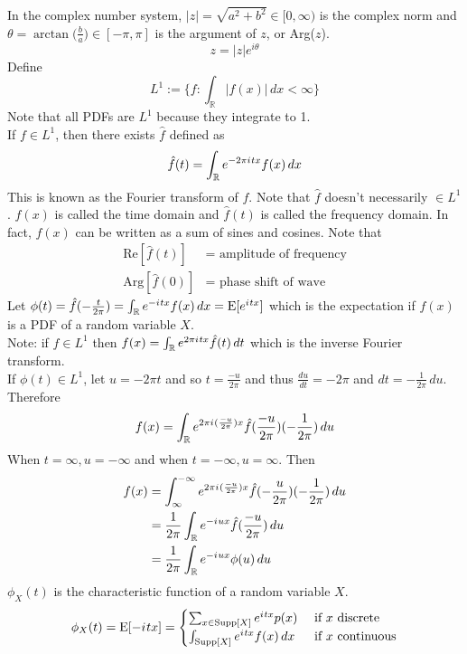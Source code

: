 \documentclass[12pt]{article}
\newcommand{\supp}[1]{\text{Supp}[ #1 ]}
\newcommand{\set}[1]{\Big\{ #1 \Big\}}
\newcommand{\expected}[1]{\mathrm{E}[#1]}
\renewcommand{\i}{{i\mkern1mu}}
\newcommand{\fhat}{\hat{f}}
\begin{document}
In the complex number system, $|z| = \sqrt{a^2 + b^2} \in [0, \infty)$ is the complex norm and $\theta = \arctan \Big( \frac{b}{a}\Big) \in [-\pi, \pi]$ is the argument of $z$, or Arg($z$). $$z = |z| e^{i\theta} $$ 
Define $$L^1 := \set{f: \int_{\mathbb{R}} |f(x)| \, dx < \infty}$$ Note that all PDFs are $L^1$ because they integrate to 1. \\ If $f \in L^1$, then there exists $\fhat$ defined as $$\fhat(t) = \int_{\mathbb{R}} e^{-2\pi \i tx} f(x) \, dx $$ This is known as the Fourier transform of $f$. Note that $\fhat$ doesn't necessarily $\in L^1$. $f(x)$ is called the time domain and $\fhat(t)$ is called the frequency domain. In fact, $f(x)$ can be written as a sum of sines and cosines. Note that 
$$ \begin{aligned} \text{Re}[\fhat(t)] &= \text{ amplitude of frequency} \\ \text{Arg}[\fhat(0)] &= \text{ phase shift of wave} \end{aligned} $$ 
Let $\phi(t) = \fhat(-\frac{t}{2\pi}) = \int_{\mathbb{R}} e^{-\i tx} f(x) \, dx = \expected{e^{\i tx}}$ which is the expectation if $f(x)$ is a PDF of a random variable $X$. \\
Note: if $\fhat \in L^1$ then $f(x) = \int_{\mathbb{R}} e^{2\pi \i tx} \fhat(t) \, dt$ which is the inverse Fourier transform. \\
If $\phi(t) \in L^1$, let $u = -2\pi t$ and so $t = \frac{-u}{2\pi}$ and thus $\frac{du}{dt} = -2\pi$ and $dt = -\frac{1}{2\pi} \, du $. Therefore $$f(x) = \int_{\mathbb{R}} e^{2\pi \i (\frac{-u}{2\pi})x} \fhat(\frac{-u}{2\pi}) (-\frac{1}{2\pi}) \, du $$ When $t = \infty, u = -\infty$ and when $t = -\infty, u = \infty$. Then $$ \begin{aligned} f(x) &= \int_\infty^{-\infty} e^{2\pi \i (\frac{-u}{2\pi})x} \fhat(-\frac{u}{2\pi}) (-\frac{1}{2\pi}) \, du \\ &= \frac{1}{2\pi} \int_{\mathbb{R}} e^{-\i ux} \fhat( \frac{-u}{2\pi}) \, du \\ &= \frac{1}{2\pi} \int_{\mathbb{R}} e^{-\i ux} \phi(u) \, du \end{aligned} $$ 
$\phi_X(t)$ is the characteristic function of a random variable $X$. 
$$ \phi_X(t) = \expected{- \i tx} = \begin{cases} \sum_{x \in \supp{X}} e^{\i tx} p(x) &\text{ if } x \text{ discrete} \\ \int_{\supp{X}} e^{\i tx} f(x) \, dx &\text{ if } x \text{ continuous} \end{cases} $$ 
\end{document}
